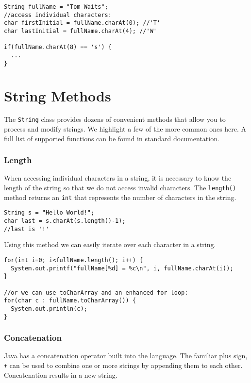 \begin{verbatim}
String fullName = "Tom Waits";
//access individual characters:
char firstInitial = fullName.charAt(0); //'T'
char lastInitial = fullName.charAt(4); //'W'

if(fullName.charAt(8) == 's') {
  ...
}
\end{verbatim}

\section{String Methods}

The \texttt{String} class provides dozens of 
convenient methods that allow you to process and modify strings.
We highlight a few of the more common ones here.  A full
list of supported functions can be found in standard 
documentation.

\subsubsection{Length}

When accessing individual characters in a string, it
is necessary to know the length of the string so
that we do not access invalid characters.  The 
\texttt{length()} method returns an \texttt{int}
that represents the number of characters in the
string.  

\begin{verbatim}
String s = "Hello World!";
char last = s.charAt(s.length()-1);
//last is '!'
\end{verbatim}

Using this method we can easily iterate over each 
character in a string.

\begin{verbatim}
for(int i=0; i<fullName.length(); i++) {
  System.out.printf("fullName[%d] = %c\n", i, fullName.charAt(i));
}

//or we can use toCharArray and an enhanced for loop:
for(char c : fullName.toCharArray()) {
  System.out.println(c);
}
\end{verbatim}

\subsubsection{Concatenation}

Java has a concatenation operator built into the language.
The familiar plus sign, \texttt{+} can be used
to combine one or more strings by appending them to each
other.  Concatenation results in a new string.

